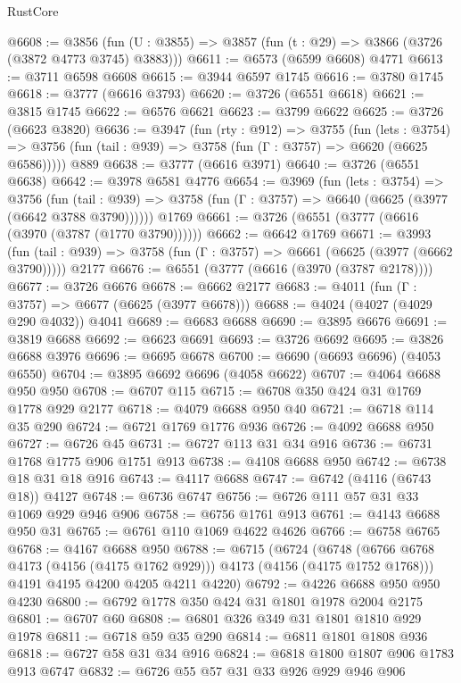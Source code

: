 \begin{lexlean}{RustCore}
\begin{coremodule}
@6608 := @3856 (fun (U : @3855) => @3857 (fun (t : @29) => @3866 (@3726 (@3872 @4773 @3745) @3883)))
@6611 := @6573 (@6599 @6608) @4771
@6613 := @3711 @6598 @6608
@6615 := @3944 @6597 @1745
@6616 := @3780 @1745
@6618 := @3777 (@6616 @3793)
@6620 := @3726 (@6551 @6618)
@6621 := @3815 @1745
@6622 := @6576 @6621
@6623 := @3799 @6622
@6625 := @3726 (@6623 @3820)
@6636 := @3947
    (fun (rty : @912) =>
    @3755
      (fun (lets : @3754) =>
      @3756 (fun (tail : @939) => @3758 (fun (Γ : @3757) => @6620 (@6625 @6586)))))
    @889
@6638 := @3777 (@6616 @3971)
@6640 := @3726 (@6551 @6638)
@6642 := @3978 @6581 @4776
@6654 := @3969
    (fun (lets : @3754) =>
    @3756
      (fun (tail : @939) => @3758 (fun (Γ : @3757) => @6640 (@6625 (@3977 (@6642 @3788 @3790))))))
    @1769
@6661 := @3726 (@6551 (@3777 (@6616 (@3970 (@3787 (@1770 @3790))))))
@6662 := @6642 @1769
@6671 := @3993
    (fun (tail : @939) => @3758 (fun (Γ : @3757) => @6661 (@6625 (@3977 (@6662 @3790)))))
    @2177
@6676 := @6551 (@3777 (@6616 (@3970 (@3787 @2178))))
@6677 := @3726 @6676
@6678 := @6662 @2177
@6683 := @4011 (fun (Γ : @3757) => @6677 (@6625 (@3977 @6678)))
@6688 := @4024 (@4027 (@4029 @290 @4032)) @4041
@6689 := @6683 @6688
@6690 := @3895 @6676
@6691 := @3819 @6688
@6692 := @6623 @6691
@6693 := @3726 @6692
@6695 := @3826 @6688 @3976
@6696 := @6695 @6678
@6700 := @6690 (@6693 @6696) (@4053 @6550)
@6704 := @3895 @6692 @6696 (@4058 @6622)
@6707 := @4064 @6688 @950 @950
@6708 := @6707 @115
@6715 := @6708 @350 @424 @31 @1769 @1778 @929 @2177
@6718 := @4079 @6688 @950 @40
@6721 := @6718 @114 @35 @290
@6724 := @6721 @1769 @1776 @936
@6726 := @4092 @6688 @950
@6727 := @6726 @45
@6731 := @6727 @113 @31 @34 @916
@6736 := @6731 @1768 @1775 @906 @1751 @913
@6738 := @4108 @6688 @950
@6742 := @6738 @18 @31 @18 @916
@6743 := @4117 @6688
@6747 := @6742 (@4116 (@6743 @18)) @4127
@6748 := @6736 @6747
@6756 := @6726 @111 @57 @31 @33 @1069 @929 @946 @906
@6758 := @6756 @1761 @913
@6761 := @4143 @6688 @950 @31
@6765 := @6761 @110 @1069 @4622 @4626
@6766 := @6758 @6765
@6768 := @4167 @6688 @950
@6788 := @6715
    (@6724
      (@6748 (@6766 @6768 @4173 (@4156 (@4175 @1762 @929))) @4173 (@4156 (@4175 @1752 @1768)))
      @4191
      @4195
      @4200
      @4205
      @4211
      @4220)
@6792 := @4226 @6688 @950 @950 @4230
@6800 := @6792 @1778 @350 @424 @31 @1801 @1978 @2004 @2175
@6801 := @6707 @60
@6808 := @6801 @326 @349 @31 @1801 @1810 @929 @1978
@6811 := @6718 @59 @35 @290
@6814 := @6811 @1801 @1808 @936
@6818 := @6727 @58 @31 @34 @916
@6824 := @6818 @1800 @1807 @906 @1783 @913 @6747
@6832 := @6726 @55 @57 @31 @33 @926 @929 @946 @906

\end{coremodule}
\end{lexlean}
